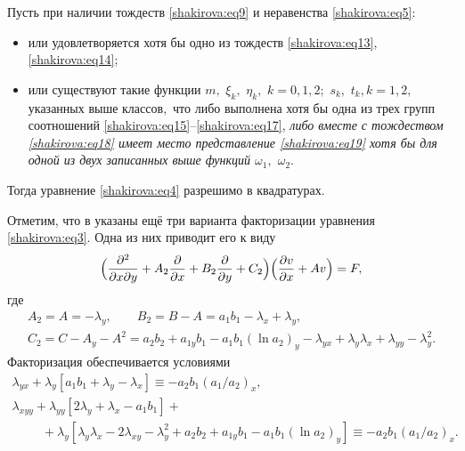 \begin{theorem}
Пусть при наличии тождеств \eqref{shakirova:eq9}  и неравенства \eqref{shakirova:eq5}{\rm:}

\begin{itemize}
\item[\rm 1)] или удовлетворяется хотя бы одно из тождеств \rm  \eqref{shakirova:eq13}, \eqref{shakirova:eq14}; \it

\item[\rm 2)] или существуют такие функции $m,$ $\xi_k,$ $\eta_k,$ $k= 0, 1, 2;$ $s_k,$ $t_k, k=1, 2,$ указанных выше классов$,$ что либо выполнена хотя бы одна из трех групп соотношений \rm \eqref{shakirova:eq15}--\eqref{shakirova:eq17}, \it  либо вместе с тождеством \eqref{shakirova:eq18}  имеет место представление \eqref{shakirova:eq19} хотя бы для одной из двух записанных выше функций $\omega_1,$ $\omega_2.$
\end{itemize}
Тогда уравнение \eqref{shakirova:eq4} разрешимо в квадратурах\rm.
\end{theorem}


Отметим, что в \cite{shakirova:6-ru}  указаны ещё три варианта факторизации уравнения \eqref{shakirova:eq3}. Одна из них приводит его к виду
\begin{equation}
\label{shakirova:eq20}
\Bigl(\frac{\partial^2}{\partial x\partial y}+A_2\frac{\partial}{\partial x}+B_2\frac{\partial}{\partial y}+C_2\Bigr)\Bigl(\frac{\partial v}{\partial x}+Av\Bigr)=F,
\end{equation}
где
\begin{gather}
A_2=A=-\lambda_y, \qquad B_2=B-A=a_1b_1-\lambda_x+\lambda_y,
\\
C_2=C-A_y-A^2=a_2b_2+a_{1y}b_1-a_1b_1(\ln a_2)_y-\lambda_{yx}+\lambda_y\lambda_x+\lambda_{yy}-\lambda^2_y.
\end{gather}
Факторизация обеспечивается условиями
\begin{equation}
\begin{array}{l}
\lambda_{yx}+\lambda_y[a_1b_1+\lambda_y-\lambda_x]\equiv-a_2b_1\left({a_1}/{a_2}\right)_x, 
\\
\lambda_{xyy}+\lambda_{yy}[2\lambda_y+\lambda_x-a_1b_1]+ \\
\hspace{1cm} +\lambda_y[\lambda_y\lambda_x-2\lambda_{xy}-\lambda^2_y+a_2b_2+a_{1y}b_1-a_1b_1(\ln a_2)_y]\equiv -a_2b_1\left({a_1}/{a_2}\right)_x.
\end{array}
\end{equation}

